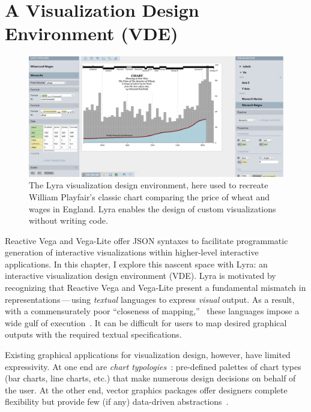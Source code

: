 \graphicspath{{./lyra/figures/}}
\chapter{A Visualization Design Environment (VDE)}

\begin{figure}[h!]
  \vspace{-40pt}
  \centering
  \includegraphics[width=\columnwidth]{playfair}
  \caption{The Lyra visualization design environment, here used to recreate William Playfair's classic chart comparing the price of wheat and wages in England. Lyra enables the design of custom visualizations without writing code.}
  \label{fig:lyra:teaser}
\end{figure}

Reactive Vega and Vega-Lite offer JSON syntaxes to facilitate programmatic
generation of interactive visualizations within higher-level interactive
applications. In this chapter, I explore this nascent space with Lyra: an
interactive visualization design environment (VDE). Lyra is motivated by
recognizing that Reactive Vega and Vega-Lite present a fundamental mismatch in
representations\,---\,using \emph{textual} languages to express \emph{visual}
output. As a result, with a commensurately poor ``closeness of
mapping,''~\cite{blackwell:cogdim} these languages impose a wide gulf of
execution~\cite{hutchins:directmanip}. It can be difficult for users to map
desired graphical outputs with the required textual specifications.

Existing graphical applications for visualization design, however, have limited
expressivity. At one end are \emph{chart typologies}~\cite{wilkinson:grammar}:
pre-defined palettes of chart types (bar charts, line charts, etc.) that make
numerous design decisions on behalf of the user. At the other end, vector
graphics packages offer designers complete flexibility but provide few (if any)
data-driven abstractions~\cite{bigelow:reflections}.






